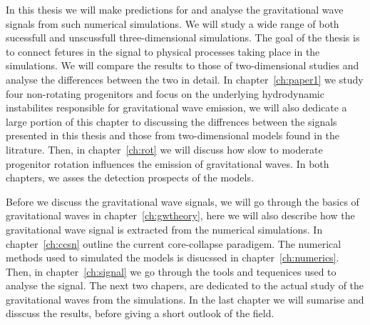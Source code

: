 In this thesis we will make predictions for and analyse the gravitational wave signals
from such numerical simulations. We will study a wide range of both sucessfull and unscussfull
three-dimensional simulations. The goal of the thesis is to connect fetures in the signal
to physical processes taking place in the simulations. We will compare the results to
those of two-dimensional studies and analyse the differences between the two in detail.
In chapter~\ref{ch:paper1} we study four non-rotating progenitors and focus on the
underlying hydrodynamic instabilites responsible for gravitational wave emission,
we will also dedicate a large portion of this chapter to discussing the diffrences between
the signals presented in this thesis and those from two-dimensional models found in the litrature.
Then, in chapter~\ref{ch:rot} we will discuss how slow to moderate progenitor rotation influences the emission of
gravitational waves. In both chapters, we asses the detection prospects of the models.

Before we discuss the gravitational wave signals, we will go through the basics of gravitational waves in
chapter~\ref{ch:gwtheory}, here we will also describe how the gravitational wave signal is extracted from the numerical simulations. In chapter~\ref{ch:ccsn} outline the current core-collapse paradigem. The numerical
methods used to simulated the models is disucssed in chapter~\ref{ch:numerics}. Then, in chapter~\ref{ch:signal}
we go through the tools and tequenices used to analyse the signal. The next two chapers, are dedicated to
the actual study of the gravitational waves from the simulations. In the last chapter we will sumarise and disscuss
the results, before giving a short outlook of the field.
